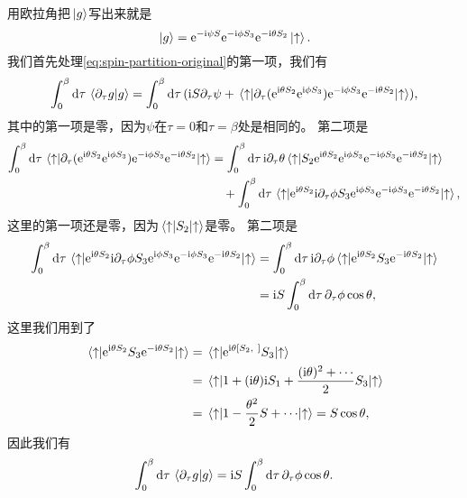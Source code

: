 用欧拉角把$\ket*{g}$写出来就是
\[
    \ket*{g} = \mathrm{e}^{- \mathrm{i} \psi S} \mathrm{e}^{- \mathrm{i} \phi S_3} \mathrm{e}^{- \mathrm{i} \theta S_2} \ket*{\uparrow}.
\]
我们首先处理\eqref{eq:spin-partition-original}的第一项，我们有
\[
    \int_0^\beta \dd{\tau} \braket*{\partial_\tau g}{g} = \int_0^\beta \dd{\tau} (\mathrm{i} S \partial_\tau \psi + \mel*{\uparrow}{\partial_\tau (\mathrm{e}^{\mathrm{i} \theta S_2} \mathrm{e}^{\mathrm{i} \phi S_3}) \mathrm{e}^{- \mathrm{i} \phi S_3} \mathrm{e}^{- \mathrm{i} \theta S_2}}{\uparrow} ),
\]
其中的第一项是零，因为$\psi$在$\tau = 0$和$\tau = \beta$处是相同的。
第二项是
\[
    \begin{aligned}
        \int_0^\beta \dd{\tau} \mel*{\uparrow}{\partial_\tau (\mathrm{e}^{\mathrm{i} \theta S_2} \mathrm{e}^{\mathrm{i} \phi S_3}) \mathrm{e}^{- \mathrm{i} \phi S_3} \mathrm{e}^{- \mathrm{i} \theta S_2}}{\uparrow} &= \int_0^\beta \dd{\tau} \mathrm{i} \partial_\tau \theta \mel*{\uparrow}{S_2 \mathrm{e}^{\mathrm{i} \theta S_2} \mathrm{e}^{\mathrm{i} \phi S_3} \mathrm{e}^{- \mathrm{i} \phi S_3} \mathrm{e}^{- \mathrm{i} \theta S_2}}{\uparrow} \\
        &\quad + \int_0^\beta \dd{\tau} \mel*{\uparrow}{\mathrm{e}^{\mathrm{i} \theta S_2} \mathrm{i} \partial_\tau \phi S_3 \mathrm{e}^{\mathrm{i} \phi S_3} \mathrm{e}^{- \mathrm{i} \phi S_3} \mathrm{e}^{- \mathrm{i} \theta S_2}}{\uparrow},
    \end{aligned}
\]
这里的第一项还是零，因为$\mel*{\uparrow}{S_2}{\uparrow}$是零。
第二项是
\[
    \begin{aligned}
        \int_0^\beta \dd{\tau} \mel*{\uparrow}{\mathrm{e}^{\mathrm{i} \theta S_2} \mathrm{i} \partial_\tau \phi S_3 \mathrm{e}^{\mathrm{i} \phi S_3} \mathrm{e}^{- \mathrm{i} \phi S_3} \mathrm{e}^{- \mathrm{i} \theta S_2}}{\uparrow} &= \int_0^\beta \dd{\tau} \mathrm{i} \partial_\tau \phi \mel*{\uparrow}{\mathrm{e}^{\mathrm{i} \theta S_2} S_3 \mathrm{e}^{- \mathrm{i} \theta S_2}}{\uparrow} \\
        &= \mathrm{i} S \int_0^\beta \dd{\tau} \partial_\tau \phi \cos \theta,
    \end{aligned}
\]
这里我们用到了
\[
    \begin{aligned}
        \mel*{\uparrow}{\mathrm{e}^{\mathrm{i} \theta S_2} S_3 \mathrm{e}^{- \mathrm{i} \theta S_2}}{\uparrow} &= \mel*{\uparrow}{\mathrm{e}^{\mathrm{i} \theta [S_2, \ ]} S_3}{\uparrow} \\
        &= \mel*{\uparrow}{1 + (\mathrm{i} \theta) \mathrm{i} S_1 + \frac{(\mathrm{i} \theta)^2 + \cdots}{2} S_3 }{\uparrow} \\
        &= \mel*{\uparrow}{1 - \frac{\theta^2}{2} S + \cdots}{\uparrow} = S \cos \theta, 
    \end{aligned}
\]
因此我们有
\begin{equation}
    \int_0^\beta \dd{\tau} \braket*{\partial_\tau g}{g} = \mathrm{i} S \int_0^\beta \dd{\tau} \partial_\tau \phi \cos \theta.
\end{equation}

